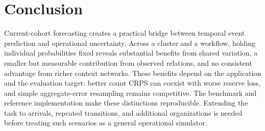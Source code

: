 \section{Conclusion}
Current-cohort forecasting creates a practical bridge between temporal event
prediction and operational uncertainty. Across a cluster and a workflow,
holding individual probabilities fixed reveals substantial benefits from
shared variation, a smaller but measurable contribution from observed
relations, and no consistent advantage from richer context networks. These
benefits depend on the application and the evaluation target: better count
CRPS can coexist with worse reserve loss, and simple aggregate-error
resampling remains competitive. The benchmark and reference implementation
make these distinctions reproducible. Extending the task to arrivals,
repeated transitions, and additional organizations is needed before treating
such scenarios as a general operational simulator.
